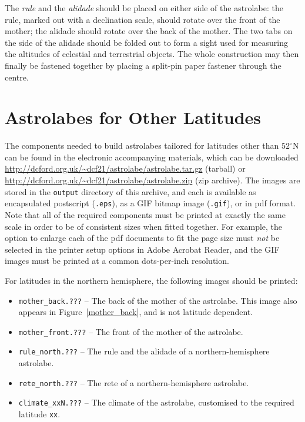 \documentclass[a4paper,onecolumn,10pt]{article}
\begin{document}
The {\it rule} and the {\it alidade} should be placed on either side of the
astrolabe: the rule, marked out with a declination scale, should rotate over
the front of the mother; the alidade should rotate over the back of the mother.
The two tabs on the side of the alidade should be folded out to form a sight
used for measuring the altitudes of celestial and terrestrial objects.  The
whole construction may then finally be fastened together by placing a split-pin
paper fastener through the centre.

\section*{Astrolabes for Other Latitudes}

The components needed to build astrolabes tailored for latitudes other than
$52^\circ$N can be found in the electronic accompanying materials, which can be
downloaded \url{http://dcford.org.uk/~dcf21/astrolabe/astrolabe.tar.gz}
(tarball) or \url{http://dcford.org.uk/~dcf21/astrolabe/astrolabe.zip} (zip
archive).  The images are stored in the {\tt output} directory of this archive,
and each is available as encapsulated postscript ({\tt .eps}), as a GIF bitmap
image ({\tt .gif}), or in pdf format.  Note that all of the required components
must be printed at exactly the same scale in order to be of consistent sizes
when fitted together. For example, the option to enlarge each of the pdf
documents to fit the page size must {\it not} be selected in the printer setup
options in Adobe Acrobat Reader, and the GIF images must be printed at a common
dots-per-inch resolution.

For latitudes in the northern hemisphere, the following images should be
printed:
\begin{itemize}
\item {\tt mother\_back.???} -- The back of the mother of the astrolabe. This image also appears in Figure~\ref{mother_back}, and is not latitude dependent.
\item {\tt mother\_front.???} -- The front of the mother of the astrolabe.
\item {\tt rule\_north.???} -- The rule and the alidade of a northern-hemisphere astrolabe.
\item {\tt rete\_north.???} -- The rete of a northern-hemisphere astrolabe.
\item{\tt climate\_xxN.???} -- The climate of the astrolabe, customised to the required latitude {\tt xx}.
\end{itemize}
\end{document}
